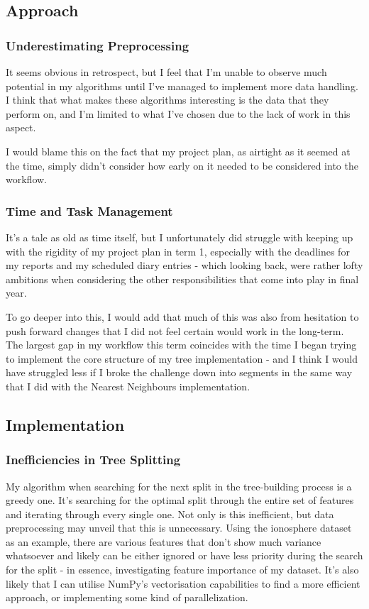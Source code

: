 \documentclass[letterpaper,10pt]{article}
\begin{document}
\subsection{Approach}
\subsubsection{Underestimating Preprocessing}
It seems obvious in retrospect, but I feel that I'm unable to observe much potential in my algorithms until I've managed to implement more data handling. I think that what makes these algorithms interesting is the data that they perform on, and I'm limited to what I've chosen due to the lack of work in this aspect. \par
I would blame this on the fact that my project plan, as airtight as it seemed at the time, simply didn't consider how early on it needed to be considered into the workflow. \par

\subsubsection{Time and Task Management}
It's a tale as old as time itself, but I unfortunately did struggle with keeping up with the rigidity of my project plan in term 1, especially with the deadlines for my reports and my scheduled diary entries - which looking back, were rather lofty ambitions when considering the other responsibilities that come into play in final year.\par
To go deeper into this, I would add that much of this was also from hesitation to push forward changes that I did not feel certain would work in the long-term. The largest gap in my workflow this term coincides with the time I began trying to implement the core structure of my tree implementation - and I think I would have struggled less if I broke the challenge down into segments in the same way that I did with the Nearest Neighbours implementation. \par
\subsection{Implementation}
\subsubsection{Inefficiencies in Tree Splitting}
My algorithm when searching for the next split in the tree-building process is a greedy one. It's searching for the optimal split through the entire set of features and iterating through every single one. Not only is this inefficient, but data preprocessing may unveil that this is unnecessary. Using the ionosphere dataset as an example, there are various features that don't show much variance whatsoever and likely can be either ignored or have less priority during the search for the split - in essence, investigating feature importance of my dataset. It's also likely that I can utilise NumPy's vectorisation capabilities to find a more efficient approach, or implementing some kind of parallelization. \par
\end{document}
